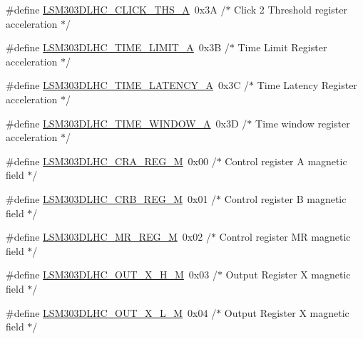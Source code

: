 \begin{DoxyCompactItemize}
\item 
\#define \hyperlink{group__STM32F3__DISCOVERY__LSM303DLHC__Exported__Constants_ga2e5cc6b6e738f931f27971e5ea1c906b}{L\+S\+M303\+D\+L\+H\+C\+\_\+\+C\+L\+I\+C\+K\+\_\+\+T\+H\+S\+\_\+\+A}~0x3\+A  /$\ast$ Click 2 Threshold register acceleration $\ast$/
\item 
\#define \hyperlink{group__STM32F3__DISCOVERY__LSM303DLHC__Exported__Constants_ga76e7b5a3f5e66a79b2ce99f2c2d9749e}{L\+S\+M303\+D\+L\+H\+C\+\_\+\+T\+I\+M\+E\+\_\+\+L\+I\+M\+I\+T\+\_\+\+A}~0x3\+B  /$\ast$ Time Limit Register acceleration $\ast$/
\item 
\#define \hyperlink{group__STM32F3__DISCOVERY__LSM303DLHC__Exported__Constants_gab1b349bb00bdb5f06d391e47856901dc}{L\+S\+M303\+D\+L\+H\+C\+\_\+\+T\+I\+M\+E\+\_\+\+L\+A\+T\+E\+N\+C\+Y\+\_\+\+A}~0x3\+C  /$\ast$ Time Latency Register acceleration $\ast$/
\item 
\#define \hyperlink{group__STM32F3__DISCOVERY__LSM303DLHC__Exported__Constants_ga406fc2bacd1b90d0e1316d7f32fecf6e}{L\+S\+M303\+D\+L\+H\+C\+\_\+\+T\+I\+M\+E\+\_\+\+W\+I\+N\+D\+O\+W\+\_\+\+A}~0x3\+D  /$\ast$ Time window register acceleration $\ast$/
\item 
\#define \hyperlink{group__STM32F3__DISCOVERY__LSM303DLHC__Exported__Constants_gab9f4239e23854fefc63697275b84a7d0}{L\+S\+M303\+D\+L\+H\+C\+\_\+\+C\+R\+A\+\_\+\+R\+E\+G\+\_\+\+M}~0x00  /$\ast$ Control register A magnetic field $\ast$/
\item 
\#define \hyperlink{group__STM32F3__DISCOVERY__LSM303DLHC__Exported__Constants_ga30b868e5b99899d67cf1b26bef18f5f5}{L\+S\+M303\+D\+L\+H\+C\+\_\+\+C\+R\+B\+\_\+\+R\+E\+G\+\_\+\+M}~0x01  /$\ast$ Control register B magnetic field $\ast$/
\item 
\#define \hyperlink{group__STM32F3__DISCOVERY__LSM303DLHC__Exported__Constants_ga90568fbcbe8e6dfb19fd6e0463bc0b33}{L\+S\+M303\+D\+L\+H\+C\+\_\+\+M\+R\+\_\+\+R\+E\+G\+\_\+\+M}~0x02  /$\ast$ Control register M\+R magnetic field $\ast$/
\item 
\#define \hyperlink{group__STM32F3__DISCOVERY__LSM303DLHC__Exported__Constants_gad4d0279c3dc4a30cd1f471494a77e610}{L\+S\+M303\+D\+L\+H\+C\+\_\+\+O\+U\+T\+\_\+\+X\+\_\+\+H\+\_\+\+M}~0x03  /$\ast$ Output Register X magnetic field $\ast$/
\item 
\#define \hyperlink{group__STM32F3__DISCOVERY__LSM303DLHC__Exported__Constants_ga5f166e456aed1041f324d695cbffa65a}{L\+S\+M303\+D\+L\+H\+C\+\_\+\+O\+U\+T\+\_\+\+X\+\_\+\+L\+\_\+\+M}~0x04  /$\ast$ Output Register X magnetic field $\ast$/
\item 

\end{DoxyCompactItemize}
